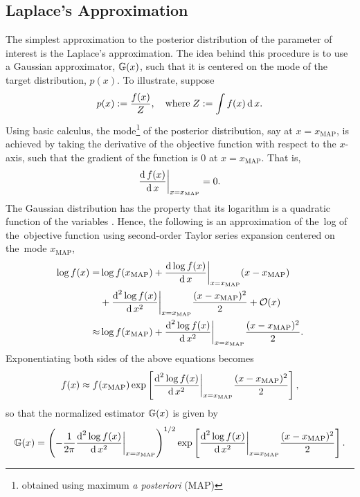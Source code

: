 \subsection{Laplace's Approximation}\label{sec:laplace}
The simplest approximation to the posterior distribution of the parameter of interest is the Laplace's approximation. The idea behind this procedure is to use a Gaussian approximator, $\mathbb{G}(x)$, such that it is centered on the mode of the target distribution, $ p(x)$. To illustrate, suppose
\begin{equation}
 p(x):=\frac{f(x)}{Z},\quad\mathrm{where}\;Z:=\int f(x)\operatorname{d} x.
\end{equation}
Using basic calculus, the mode\footnote{obtained using maximum \textit{a posteriori} (MAP)} of the posterior distribution, say at $x=x_{\text{MAP}}$, is achieved by taking the derivative of the objective function with respect to the $x$-axis, such that the gradient of the function is $0$ at $x=x_{\text{MAP}}$. That is,
\begin{equation}
\frac{\operatorname{d} f(x)}{\operatorname{d} x}\bigg|_{x=x_{\text{MAP}}}=0.
\end{equation}
The Gaussian distribution has the property that its logarithm is a quadratic function of the variables \cite{bishop}. Hence, the following is an approximation of \mbox{the log} of \mbox{the objective} function using second-order Taylor series expansion centered on \mbox{the mode} $x_{\text{MAP}}$, 
\begin{align}
\log f(x)=&\log f(x_{\text{MAP}})+\frac{\operatorname{d} \log f(x)}{\operatorname{d} x}\bigg|_{x=x_{\text{MAP}}}(x-x_{\text{MAP}})\\
&+\frac{\operatorname{d}^2 \log f(x)}{\operatorname{d} x^2}\bigg|_{x=x_{\text{MAP}}}\frac{(x-x_{\text{MAP}})^2}{2}+\mathcal{O}(x)\\
\approx&\log f(x_{\text{MAP}})+\frac{\operatorname{d}^2 \log f(x)}{\operatorname{d} x^2}\bigg|_{x=x_{\text{MAP}}}\frac{(x-x_{\text{MAP}})^2}{2}.
\end{align}
Exponentiating both sides of the above equations becomes
\begin{equation}
f(x)\approx f(x_{\text{MAP}})\exp\left[\frac{\operatorname{d}^2 \log f(x)}{\operatorname{d} x^2}\bigg|_{x=x_{\text{MAP}}}\frac{(x-x_{\text{MAP}})^2}{2}\right],
\end{equation}
so that the normalized estimator $\mathbb{G}(x)$ is given by
\begin{equation}
\mathbb{G}(x)=\left(-\frac{1}{2\pi}\frac{\operatorname{d}^2 \log f(x)}{\operatorname{d} x^2}\bigg|_{x=x_{\text{MAP}}}\right)^{1/2}\exp\left[\frac{\operatorname{d}^2 \log f(x)}{\operatorname{d} x^2}\bigg|_{x=x_{\text{MAP}}}\frac{(x-x_{\text{MAP}})^2}{2}\right].
\end{equation}
